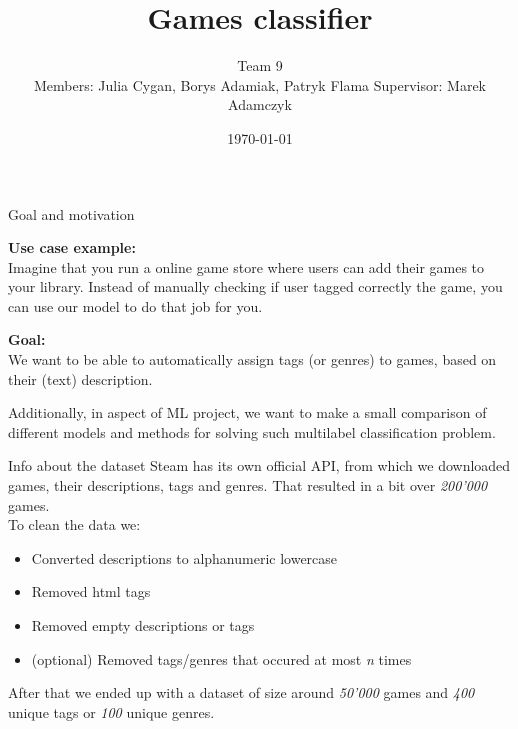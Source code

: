 \documentclass{beamer}
\title{Games classifier}
\author[Team 9]{Team 9\\[5mm]
{\small Members: Julia Cygan, Borys Adamiak, Patryk Flama}
\hspace{18mm} 
{\small Supervisor: Marek Adamczyk}}
\institute{UWr}
\date{\today}
\begin{document}
\begin{frame}
\titlepage
\end{frame}


\begin{frame}[t]{Goal and motivation}

{\bf Use case example:} \\
Imagine that you run a online game store where users can add their games to your library. Instead of manually checking if user tagged correctly the game, you can use our model to do that job for you. \\

\vspace{3mm}

{\bf Goal:} \\
We want to be able to automatically assign tags (or genres) to games, based on their (text) description.

\vspace{3mm}

Additionally, in aspect of ML project, we want to make a small comparison of different models and methods for solving such multilabel classification problem.
\end{frame}

\begin{frame}[t]{Info about the dataset}
Steam has its own official API, from which we downloaded games, their descriptions, tags and genres. That resulted in a bit over {\it 200'000} games. \\
\vspace{2mm}
To clean the data we:
\begin{itemize}
	\item Converted descriptions to alphanumeric lowercase
	\item Removed html tags
	\item Removed empty descriptions or tags
	\item (optional) Removed tags/genres that occured at most {\it n} times
\end{itemize}
After that we ended up with a dataset of size around {\it 50'000} games and {\it 400} unique tags or {\it 100} unique genres.

\end{frame}
\end{document}
